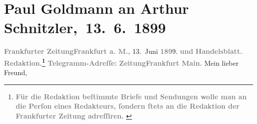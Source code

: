 

         
         \renewcommand{\erwaehntePersonen}{Personen: Richard Beer-Hofmann, Paul Goldmann}
         \renewcommand{\erwaehnteInstitutionen}{Institutionen: Frankfurter Zeitung}
         \renewcommand{\erwaehnteOrte}{Orte: Deutschland, Frankfurt am Main, Frankreich, Italien, Kärnten, Salzburg, Südtirol, Tirol, Vosges, Wien}
         \renewcommand{\erwaehnteWerke}{}
               \section[ Paul Goldmann an Arthur Schnitzler, 13. 6. 1899]{ Paul Goldmann an Arthur Schnitzler, 13. 6. 1899}\nopagebreak{}\rehead{ }\begin{ledgroupsized}[t]{13cm}\normalsize\beginnumbering{} \toendnotes[C]{\smallbreak\pagebreak[2]} 
\toendnotes[C]{\smallbreak}\pstart
           \noindent{}{\pb}\textcolor{gray}{\textbf{\textbf{Frankfurter Zeitung}}}\hfill \textcolor{gray}{\textbf{\textbf{Frankfurt a. M.,}}}{ }13. Juni \textcolor{gray}{\textbf{189}}9.\pend
           \pstart
           \textcolor{gray}{\textbf{und}}\pend
           \pstart
           \textcolor{gray}{\textbf{Handelsblatt.}}\pend
           \pstart
           \textcolor{gray}{\textbf{\textbf{Redaktion.}\footnote{\noindent{}\textcolor{gray}{\textbf{ Für die Redaktion beſtimmte Briefe und Sendungen wolle man
                                  an die Perſon eines Redakteurs,
                              ſondern ſtets \textbf{an die Redaktion der Frankfurter Zeitung} adreſſiren. }}}}}\pend
           \pstart
           \textcolor{gray}{\textbf{Telegramm-Adreſſe:}}\pend
           \pstart
           \textcolor{gray}{\textbf{\textbf{ZeitungFrankfurt Main.}}}\pend
           \pstart\center{}Mein lieber Freund,\pend\pstart

\end{ledgroupsized}
